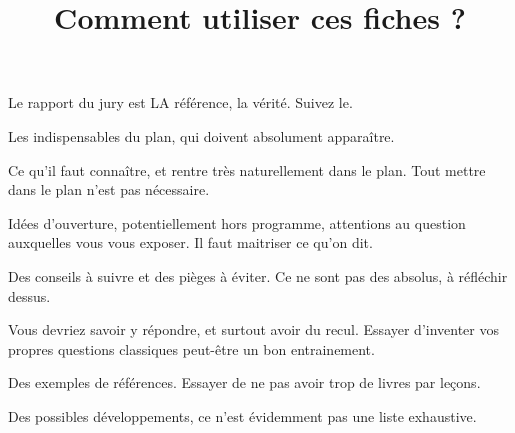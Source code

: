 \documentclass{agregfiche}
\title{Comment utiliser ces fiches ?}
\begin{document}
\maketitle

\secrapports
Le rapport du jury est LA référence, la vérité. Suivez le.
\secindispensables

Les indispensables du plan, qui doivent absolument apparaître.

\secasavoir

Ce qu'il faut connaître, et rentre très naturellement dans le plan. Tout mettre dans le plan n'est pas nécessaire.

\secidees

Idées d'ouverture, potentiellement hors programme, attentions au question auxquelles vous vous exposer. Il faut maitriser ce qu'on dit.

\secpieges

Des conseils à suivre et des pièges à éviter. Ce ne sont pas des absolus, à réfléchir dessus.

\secquestionsclassiques

Vous devriez savoir y répondre, et surtout avoir du recul. Essayer d'inventer vos propres questions classiques peut-être un bon entrainement.

\secreferences

Des exemples de références. Essayer de ne pas avoir trop de livres par leçons. 


\secdev
Des possibles développements, ce n'est évidemment pas une liste exhaustive. 
\end{document}
